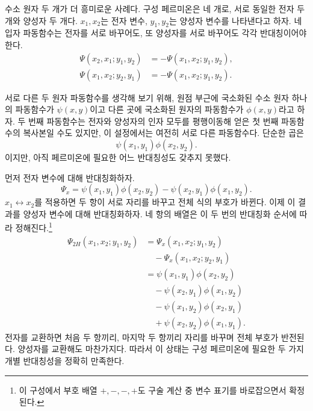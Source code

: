 수소 원자 두 개가 더 흥미로운 사례다. 구성 페르미온은 네 개로, 서로 동일한 전자 두 개와 양성자 두 개다. \(x_1,x_2\)는 전자 변수, \(y_1,y_2\)는 양성자 변수를 나타낸다고 하자. 네 입자 파동함수는 전자를 서로 바꾸어도, 또 양성자를 서로 바꾸어도 각각 반대칭이어야 한다.
\begin{align}
\Psi(x_2,x_1;y_1,y_2)
&=-\Psi(x_1,x_2;y_1,y_2),\\
\Psi(x_1,x_2;y_2,y_1)
&=-\Psi(x_1,x_2;y_1,y_2).
\end{align}

서로 다른 두 원자 파동함수를 생각해 보기 위해, 원점 부근에 국소화된 수소 원자 하나의 파동함수가 \(\psi(x,y)\)이고 다른 곳에 국소화된 원자의 파동함수가 \(\phi(x,y)\)라고 하자. 두 번째 파동함수는 전자와 양성자의 인자 모두를 평행이동해 얻은 첫 번째 파동함수의 복사본일 수도 있지만, 이 설정에서는 여전히 서로 다른 파동함수다. 단순한 곱은
\begin{equation}
\psi(x_1,y_1)\phi(x_2,y_2).
\end{equation}
이지만, 아직 페르미온에 필요한 어느 반대칭성도 갖추지 못했다.

먼저 전자 변수에 대해 반대칭화하자.
\begin{equation}
\Psi_x=
\psi(x_1,y_1)\phi(x_2,y_2)
-\psi(x_2,y_1)\phi(x_1,y_2).
\end{equation}
\(x_1\leftrightarrow x_2\)를 적용하면 두 항이 서로 자리를 바꾸고 전체 식의 부호가 바뀐다. 이제 이 결과를 양성자 변수에 대해 반대칭화하자. 네 항의 배열은 이 두 번의 반대칭화 순서에 따라 정해진다.\footnote{이 구성에서 부호 배열 \(+,-,-,+\)도 구술 계산 중 변수 표기를 바로잡으면서 확정된다.}
\begin{align}
\Psi_{2H}(x_1,x_2;y_1,y_2)
&=\Psi_x(x_1,x_2;y_1,y_2)\nonumber\\
&\quad{}-\Psi_x(x_1,x_2;y_2,y_1)\\
&=\psi(x_1,y_1)\phi(x_2,y_2)\nonumber\\
&\quad{}-\psi(x_2,y_1)\phi(x_1,y_2)\nonumber\\
&\quad{}-\psi(x_1,y_2)\phi(x_2,y_1)\nonumber\\
&\quad{}+\psi(x_2,y_2)\phi(x_1,y_1).
\label{eq:two-hydrogen-antisymmetrized}
\end{align}
전자를 교환하면 처음 두 항끼리, 마지막 두 항끼리 자리를 바꾸며 전체 부호가 반전된다. 양성자를 교환해도 마찬가지다. 따라서 이 상태는 구성 페르미온에 필요한 두 가지 개별 반대칭성을 정확히 만족한다.

\begin{classroomqa}
\end{classroomqa}


